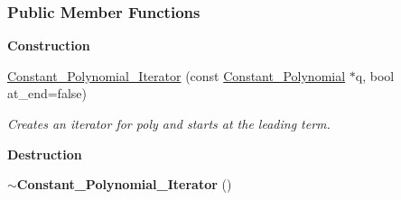 \subsubsection*{Public Member Functions}
\begin{Indent}\textbf{ Construction}\par
\begin{DoxyCompactItemize}
\item 
\hyperlink{group___iterator_group_ab2e59cf23f80448b3b2be7573181c1b7}{Constant\+\_\+\+Polynomial\+\_\+\+Iterator} (const \hyperlink{group__polygroup_class_constant___polynomial}{Constant\+\_\+\+Polynomial} $\ast$q, bool at\+\_\+end=false)
\begin{DoxyCompactList}\small\item\em Creates an iterator for {\ttfamily poly} and starts at the leading term. \end{DoxyCompactList}\end{DoxyCompactItemize}
\end{Indent}
\begin{Indent}\textbf{ Destruction}\par
\begin{DoxyCompactItemize}
\item 
\mbox{\label{group___iterator_group_a929c0ee12daaa99dc7961825507434fb}} 
{\bfseries $\sim$\+Constant\+\_\+\+Polynomial\+\_\+\+Iterator} ()
\end{DoxyCompactItemize}
\end{Indent}
